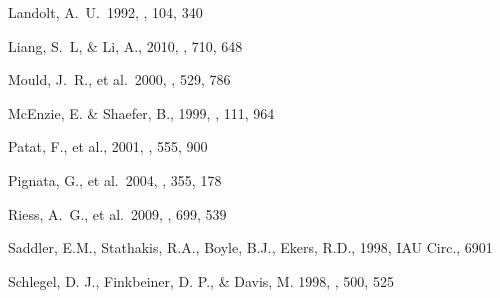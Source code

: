  Landolt, A.~U.\ 1992, \aj, 104, 340

 Liang, S.~L, \& Li, A., 2010, \apj, 710, 648




 Mould, J.~R., et al.\ 2000, \apj, 529, 786 


 McEnzie, E. \& Shaefer, B., 1999, \pasp, 111, 964
 

 Patat, F., et al., 2001, \apj, 555, 900

 Pignata, G., et al.\ 2004, \mnras, 355, 178 
 



 Riess, A.~G., et al.\ 2009, \apj, 699, 539
 


 Saddler, E.M., Stathakis, R.A., Boyle, B.J., Ekers, R.D., 1998, IAU Circ., 6901

 Schlegel, D. J., Finkbeiner, D. P., \& Davis, M. 1998, \apj, 500, 525

